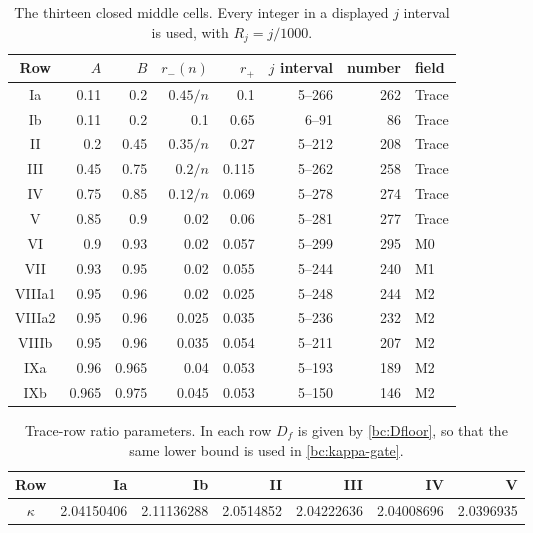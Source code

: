 \documentclass[11pt,reqno]{amsart}
\numberwithin{equation}{section}
\theoremstyle{definition}
\theoremstyle{remark}
\begin{document}
\begin{table}[ht]
\centering\small
\caption{The thirteen closed middle cells.  Every integer in a displayed
$j$ interval is used, with $R_j=j/1000$.}
\label{bc:compact-cover}
\begin{tabular}{@{}crrrrrrl@{}}\toprule
Row&$A$&$B$&$r_-(n)$&$r_+$&$j$ interval&number&field\\\midrule
Ia & 0.11 & 0.2 & $0.45/n$ & 0.1 & 5--266 & 262 & Trace\\
Ib & 0.11 & 0.2 & 0.1 & 0.65 & 6--91 & 86 & Trace\\
II & 0.2 & 0.45 & $0.35/n$ & 0.27 & 5--212 & 208 & Trace\\
III & 0.45 & 0.75 & $0.2/n$ & 0.115 & 5--262 & 258 & Trace\\
IV & 0.75 & 0.85 & $0.12/n$ & 0.069 & 5--278 & 274 & Trace\\
V & 0.85 & 0.9 & 0.02 & 0.06 & 5--281 & 277 & Trace\\
VI & 0.9 & 0.93 & 0.02 & 0.057 & 5--299 & 295 & M0\\
VII & 0.93 & 0.95 & 0.02 & 0.055 & 5--244 & 240 & M1\\
VIIIa1 & 0.95 & 0.96 & 0.02 & 0.025 & 5--248 & 244 & M2\\
VIIIa2 & 0.95 & 0.96 & 0.025 & 0.035 & 5--236 & 232 & M2\\
VIIIb & 0.95 & 0.96 & 0.035 & 0.054 & 5--211 & 207 & M2\\
IXa & 0.96 & 0.965 & 0.04 & 0.053 & 5--193 & 189 & M2\\
IXb & 0.965 & 0.975 & 0.045 & 0.053 & 5--150 & 146 & M2\\
\bottomrule\end{tabular}
\end{table}
\begin{table}[ht]
\centering\small
\caption{Trace-row ratio parameters.  In each row $D_f$ is given by
\eqref{bc:Dfloor}, so that the same lower bound is used in
\eqref{bc:kappa-gate}.}
\label{bc:trace-ratios}
\begin{tabular}{@{}crrrrrr@{}}\toprule
Row&Ia&Ib&II&III&IV&V\\\midrule
$\kappa$&2.04150406 & 2.11136288 & 2.0514852 & 2.04222636 & 2.04008696 & 2.0396935\\
\bottomrule\end{tabular}
\end{table}
\end{document}

